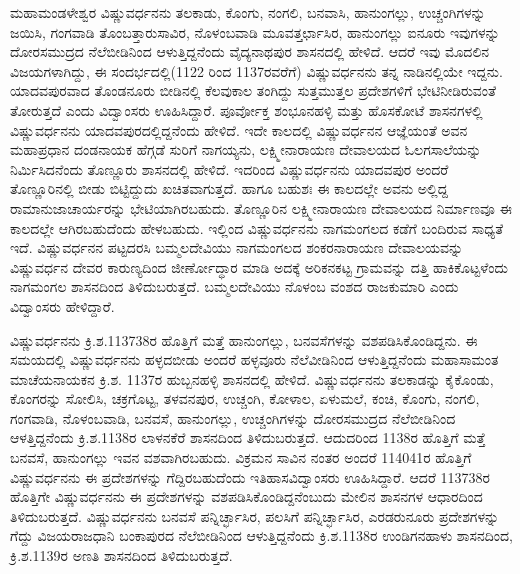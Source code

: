 ಮಹಾಮಂಡಳೇಶ್ವರ ವಿಷ್ಣುವರ್ಧನನು ತಲಕಾಡು, ಕೊಂಗು, ನಂಗಲಿ, ಬನವಾಸಿ, ಹಾನುಂಗಲ್ಲು, ಉಚ್ಚಂಗಿಗಳನ್ನು ಜಯಿಸಿ, ಗಂಗವಾಡಿ ತೊಂಬತ್ತಾರುಸಾವಿರ, ನೊಳಂಬವಾಡಿ ಮೂವತ್ತರ್ಛಾಸಿರ, ಹಾನುಂಗಲ್ಲು ಐನೂರು ಇವುಗಳನ್ನು ದೋರಸಮುದ್ರದ ನೆಲೆಬೀಡಿನಿಂದ ಆಳುತ್ತಿದ್ದನೆಂದು ವೈದ್ಯನಾಥಪುರ ಶಾಸನದಲ್ಲಿ ಹೇಳಿದೆ. ಆದರೆ ಇವು ಮೊದಲಿನ ವಿಜಯಗಳಾಗಿದ್ದು, ಈ ಸಂದರ್ಭದಲ್ಲಿ(1122 ರಿಂದ 1137ರವರೆಗೆ) ವಿಷ್ಣುವರ್ಧನನು ತನ್ನ ನಾಡಿನಲ್ಲಿಯೇ ಇದ್ದನು. ಯಾದವಪುರವಾದ ತೊಂಡನೂರು ಬೀಡಿನಲ್ಲಿ ಕೆಲವುಕಾಲ ತಂಗಿದ್ದು ಸುತ್ತಮುತ್ತಲ ಪ್ರದೇಶಗಳಿಗೆ ಭೇಟಿನೀಡಿರುವಂತೆ ತೋರುತ್ತದೆ ಎಂದು ವಿದ್ವಾಂಸರು ಊಹಿಸಿದ್ದಾರೆ. ಪೂರ್ವೋಕ್ತ ಶಂಭೂನಹಳ್ಳಿ ಮತ್ತು ಹೊಸಕೋಟೆ ಶಾಸನಗಳಲ್ಲಿ ವಿಷ್ಣುವರ್ಧನನು ಯಾದವಪುರದಲ್ಲಿದ್ದನೆಂದು ಹೇಳಿದೆ. ಇದೇ ಕಾಲದಲ್ಲಿ ವಿಷ್ಣುವರ್ಧನನ ಆಜ್ಞೆಯಂತೆ ಅವನ ಮಹಾಪ್ರಧಾನ ದಂಡನಾಯಕ ಹೆಗ್ಗಡೆ ಸುರಿಗೆ ನಾಗಯ್ಯನು, ಲಕ್ಷ್ಮೀನಾರಾಯಣ ದೇವಾಲಯದ ಓಲಗಸಾಲೆಯನ್ನು ನಿರ್ಮಿಸಿದನೆಂದು ತೊಣ್ಣೂರು ಶಾಸನದಲ್ಲಿ ಹೇಳಿದೆ. ಇದರಿಂದ ವಿಷ್ಣುವರ್ಧನನು ಯಾದವಪುರ ಅಂದರೆ ತೊಣ್ಣೂರಿನಲ್ಲಿ ಬೀಡು ಬಿಟ್ಟಿದ್ದುದು ಖಚಿತವಾಗುತ್ತದೆ. ಹಾಗೂ ಬಹುಶಃ ಈ ಕಾಲದಲ್ಲೇ ಅವನು ಅಲ್ಲಿದ್ದ ರಾಮಾನುಜಾಚಾರ್ಯರನ್ನು ಭೇಟಿಯಾಗಿರಬಹುದು. ತೊಣ್ಣೂರಿನ ಲಕ್ಷ್ಮೀನಾರಾಯಣ ದೇವಾಲಯದ ನಿರ್ಮಾಣವೂ ಈ ಕಾಲದಲ್ಲೇ ಆಗಿರಬಹುದೆಂದು ಹೇಳಬಹುದು. ಇಲ್ಲಿಂದ ವಿಷ್ಣುವರ್ಧನನು ನಾಗಮಂಗಲದ ಕಡೆಗೆ ಬಂದಿರುವ ಸಾಧ್ಯತೆ ಇದೆ. ವಿಷ್ಣುವರ್ಧನನ ಪಟ್ಟದರಸಿ ಬಮ್ಮಲದೇವಿಯು ನಾಗಮಂಗಲದ ಶಂಕರನಾರಾಯಣ ದೇವಾಲಯವನ್ನು ವಿಷ್ಣುವರ್ಧನ ದೇವರ ಕಾರುಣ್ಯದಿಂದ ಜೀರ್ಣೋದ್ಧಾರ ಮಾಡಿ ಅದಕ್ಕೆ ಅರಿಕನಕಟ್ಟ ಗ್ರಾಮವನ್ನು ದತ್ತಿ ಹಾಕಿಕೊಟ್ಟಳೆಂದು ನಾಗಮಂಗಲ ಶಾಸನದಿಂದ ತಿಳಿದುಬರುತ್ತದೆ. ಬಮ್ಮಲದೇವಿಯು ನೊಳಂಬ ವಂಶದ ರಾಜಕುಮಾರಿ ಎಂದು ವಿದ್ವಾಂಸರು ಹೇಳಿದ್ದಾರೆ.

ವಿಷ್ಣುವರ್ಧನನು ಕ್ರಿ.ಶ.1137\enginline{-}38ರ ಹೊತ್ತಿಗೆ ಮತ್ತೆ ಹಾನುಂಗಲ್ಲು, ಬನವಸೆಗಳನ್ನು ವಶಪಡಿಸಿಕೊಂಡಿದ್ದನು. ಈ ಸಮಯ\-ದಲ್ಲಿ ವಿಷ್ಣುವರ್ಧನನು ಹಳ್ಳದಬೀಡು ಅಂದರೆ ಹಳ್ಳವೂರು ನೆಲೆವೀಡಿನಿಂದ ಆಳುತ್ತಿದ್ದನೆಂದು ಮಹಾಸಾಮಂತ ಮಾಚೆಯನಾಯಕನ ಕ್ರಿ.ಶ. 1137ರ ಹುಬ್ಬನಹಳ್ಳಿ ಶಾಸನದಲ್ಲಿ ಹೇಳಿದೆ. ವಿಷ್ಣುವರ್ಧನನು ತಲಕಾಡನ್ನು ಕೈಕೊಂಡು, ಕೊಂಗರನ್ನು ಸೋಲಿಸಿ, ಚಕ್ರಗೊಟ್ಟ, ತಳವನಪುರ, ಉಚ್ಚಂಗಿ, ಕೋಳಾಲ, ಏಳುಮಲೆ, ಕಂಚಿ, ಕೊಂಗು, ನಂಗಲಿ, ಗಂಗವಾಡಿ, ನೊಳಂಬವಾಡಿ, ಬನವಸೆ, ಹಾನುಂಗಲ್ಲು, ಉಚ್ಚಂಗಿಗಳನ್ನು ದೋರಸಮುದ್ರದ ನೆಲೆಬೀಡಿನಿಂದ ಆಳತ್ತಿದ್ದನೆಂದು ಕ್ರಿ.ಶ.1138ರ ಲಾಳನಕೆರೆ ಶಾಸನದಿಂದ ತಿಳಿದುಬರುತ್ತದೆ. ಆದುದರಿಂದ 1138ರ ಹೊತ್ತಿಗೆ ಮತ್ತೆ ಬನವಸೆ, ಹಾನುಂಗಲ್ಲು ಇವನ ವಶವಾಗಿರಬಹುದು. ವಿಕ್ರಮನ ಸಾವಿನ ನಂತರ ಅಂದರೆ 1140\enginline{-}41ರ ಹೊತ್ತಿಗೆ ವಿಷ್ಣುವರ್ಧನನು ಈ ಪ್ರದೇಶಗಳನ್ನು ಗೆದ್ದಿರಬಹುದೆಂದು ಇತಿಹಾಸವಿದ್ವಾಂಸರು ಊಹಿಸಿದ್ದಾರೆ. ಆದರೆ 1137\enginline{-}38ರ ಹೊತ್ತಿಗೇ ವಿಷ್ಣುವರ್ಧನನು ಈ ಪ್ರದೇಶಗಳನ್ನು ವಶಪಡಿಸಿಕೊಂಡಿದ್ದನೆಂಬುದು ಮೇಲಿನ ಶಾಸನಗಳ ಆಧಾರದಿಂದ ತಿಳಿದುಬರುತ್ತದೆ. ವಿಷ್ಣುವರ್ಧನನು ಬನವಸೆ ಪನ್ನಿರ್ಚ್ಛಾಸಿರ, ಪಲಸಿಗೆ ಪನ್ನಿರ್ಚ್ಛಾಸಿರ, ಎರಡರುನೂರು ಪ್ರದೇಶಗಳನ್ನು ಗೆದ್ದು ವಿಜಯರಾಜಧಾನಿ ಬಂಕಾಪುರದ ನೆಲೆಬೀಡಿನಿಂದ ಆಳುತ್ತಿದ್ದ\-ನೆಂದು ಕ್ರಿ.ಶ.1138ರ ಉಂಡಿಗನಹಾಳು ಶಾಸನದಿಂದ, ಕ್ರಿ.ಶ.1139ರ ಅಣತಿ ಶಾಸನದಿಂದ ತಿಳಿದುಬರುತ್ತದೆ.

